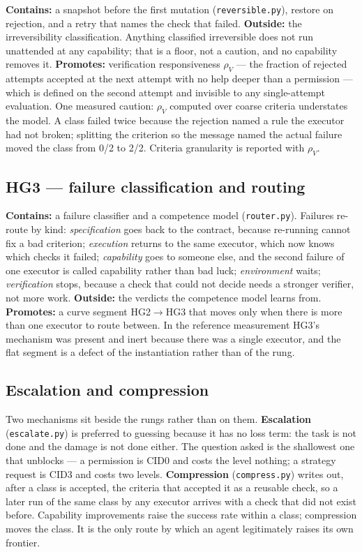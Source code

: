 \documentclass[11pt]{article}
\theoremstyle{definition}
\begin{document}
\textbf{Contains:} a snapshot before the first mutation (\texttt{reversible.py}), restore on rejection, and a retry that names the check that failed. \textbf{Outside:} the irreversibility classification. Anything classified irreversible does not run unattended at any capability; that is a floor, not a caution, and no capability removes it. \textbf{Promotes:} verification responsiveness $\rho_V$ --- the fraction of rejected attempts accepted at the next attempt with no help deeper than a permission --- which is defined on the second attempt and invisible to any single-attempt evaluation. One measured caution: $\rho_V$ computed over coarse criteria understates the model. A class failed twice because the rejection named a rule the executor had not broken; splitting the criterion so the message named the actual failure moved the class from 0/2 to 2/2. Criteria granularity is reported with $\rho_V$.

\subsection{HG3 --- failure classification and routing}

\textbf{Contains:} a failure classifier and a competence model (\texttt{router.py}). Failures re-route by kind: \emph{specification} goes back to the contract, because re-running cannot fix a bad criterion; \emph{execution} returns to the same executor, which now knows which checks it failed; \emph{capability} goes to someone else, and the second failure of one executor is called capability rather than bad luck; \emph{environment} waits; \emph{verification} stops, because a check that could not decide needs a stronger verifier, not more work. \textbf{Outside:} the verdicts the competence model learns from. \textbf{Promotes:} a curve segment HG2$\to$HG3 that moves only when there is more than one executor to route between. In the reference measurement HG3's mechanism was present and inert because there was a single executor, and the flat segment is a defect of the instantiation rather than of the rung.

\subsection{Escalation and compression}

Two mechanisms sit beside the rungs rather than on them. \textbf{Escalation} (\texttt{escalate.py}) is preferred to guessing because it has no loss term: the task is not done and the damage is not done either. The question asked is the shallowest one that unblocks --- a permission is CID0 and costs the level nothing; a strategy request is CID3 and costs two levels. \textbf{Compression} (\texttt{compress.py}) writes out, after a class is accepted, the criteria that accepted it as a reusable check, so a later run of the same class by any executor arrives with a check that did not exist before. Capability improvements raise the success rate within a class; compression moves the class. It is the only route by which an agent legitimately raises its own frontier.
\end{document}
